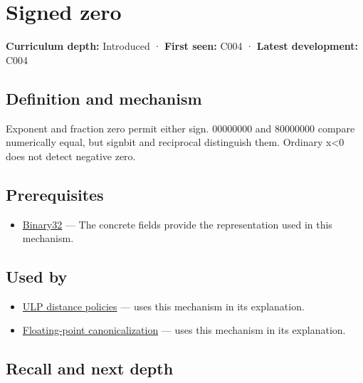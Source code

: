 \hypertarget{appendix-3a048f032c1f}{}\label{referencestart:appendix-3a048f032c1f}
\section{Signed zero}\label{appendix-3a048f032c1f-signed-zero}

\textbf{Curriculum depth:} Introduced · \textbf{First seen:} C004 · \textbf{Latest development:} C004

\subsection{Definition and mechanism}\label{appendix-3a048f032c1f-definition-and-mechanism}

Exponent and fraction zero permit either sign. 00000000 and 80000000 compare numerically equal, but signbit and reciprocal distinguish them. Ordinary x\textless0 does not detect negative zero.

\subsection{Prerequisites}\label{appendix-3a048f032c1f-prerequisites}

\begin{itemize}
\tightlist
\item
  \hyperref[appendix-5057f9ad327f]{Binary32} --- The concrete fields provide the representation used in this mechanism.
\end{itemize}

\subsection{Used by}\label{appendix-3a048f032c1f-used-by}

\begin{itemize}
\tightlist
\item
  \hyperref[appendix-deca299ae4b8]{ULP distance policies} --- uses this mechanism in its explanation.
\item
  \hyperref[appendix-e90053a4b201]{Floating-point canonicalization} --- uses this mechanism in its explanation.
\end{itemize}

\subsection{Recall and next depth}\label{appendix-3a048f032c1f-recall-and-next-depth}

